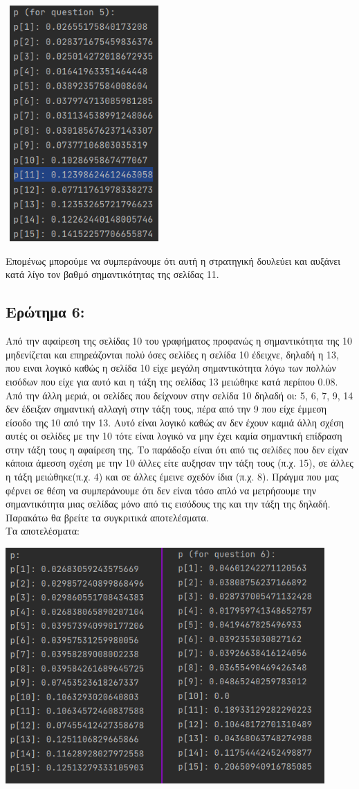 \documentclass{article}
\begin{document}
\begin{center}\includegraphics[width = 6cm, height = 9cm]{images/results_33.png}\end{center}

Επομένως μπορούμε να συμπεράνουμε ότι αυτή η στρατηγική δουλεύει και αυξάνει κατά λίγο τον βαθμό σημαντικότητας της σελίδας 11.

\subsection{Ερώτημα 6:}

Από την αφαίρεση της σελίδας 10 του γραφήματος προφανώς η σημαντικότητα της 10 μηδενίζεται και επηρεάζονται πολύ όσες σελίδες η σελίδα 10 έδειχνε, δηλαδή η 13, που ειναι λογικό καθώς η σελίδα 10 είχε μεγάλη σημαντικότητα λόγω των πολλών εισόδων που είχε για αυτό και η τάξη της σελίδας 13 μειώθηκε κατά περίπου 0.08. Από την άλλη μεριά, οι σελίδες που δείχνουν στην σελίδα 10 δηλαδή οι: 5, 6, 7, 9, 14 δεν έδειξαν σημαντική αλλαγή στην τάξη τους, πέρα από την 9 που είχε έμμεση είσοδο της 10 από την 13. Αυτό είναι λογικό καθώς αν δεν έχουν καμιά άλλη σχέση αυτές οι σελίδες με την 10 τότε είναι λογικό να μην έχει καμία σημαντική επίδραση στην τάξη τους η αφαίρεση της. Το παράδοξο είναι ότι από τις σελίδες που δεν είχαν κάποια άμεσση σχέση με την 10 άλλες είτε αυξησαν την τάξη τους (π.χ. 15), σε άλλες η τάξη μειώθηκε(π.χ. 4) και σε άλλες έμεινε σχεδόν ίδια (π.χ. 8). Πράγμα που μας φέρνει σε θέση να συμπεράνουμε ότι δεν είναι τόσο απλό να μετρήσουμε την σημαντικότητα μιας σελίδας μόνο από τις εισόδους της και την τάξη της δηλαδή. Παρακάτω θα βρείτε τα συγκριτικά αποτελέσματα.\\
 
Τα αποτελέσματα:
\begin{center}\includegraphics[height = 9cm]{images/results_34.png}\end{center}
\end{document}
